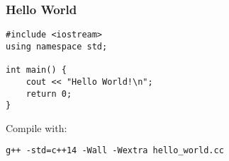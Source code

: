 \begin{frame}[fragile]
    \frametitle{Hello World}
\begin{lstlisting}
#include <iostream>
using namespace std;

int main() {
    cout << "Hello World!\n";
    return 0;
}
\end{lstlisting}
Compile with:
\begin{lstlisting}[numbers=none]
g++ -std=c++14 -Wall -Wextra hello_world.cc
\end{lstlisting}
\end{frame}


